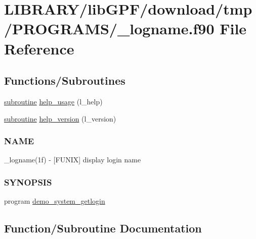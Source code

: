 \hypertarget{__logname_8f90}{}\section{L\+I\+B\+R\+A\+R\+Y/lib\+G\+P\+F/download/tmp/\+P\+R\+O\+G\+R\+A\+M\+S/\+\_\+logname.f90 File Reference}
\label{__logname_8f90}
\subsection*{Functions/\+Subroutines}
\begin{DoxyCompactItemize}
\item 
\hyperlink{M__stopwatch_83_8txt_acfbcff50169d691ff02d4a123ed70482}{subroutine} \hyperlink{__logname_8f90_a3e09a3b52ee8fb04eeb93fe5761626a8}{help\+\_\+usage} (l\+\_\+help)
\item 
\hyperlink{M__stopwatch_83_8txt_acfbcff50169d691ff02d4a123ed70482}{subroutine} \hyperlink{__logname_8f90_a39c21619b08a3c22f19e2306efd7f766}{help\+\_\+version} (l\+\_\+version)
\begin{DoxyCompactList}\small\item\em \subsubsection*{N\+A\+ME}

\+\_\+logname(1f) -\/ \mbox{[}F\+U\+N\+IX\mbox{]} display login name \subsubsection*{S\+Y\+N\+O\+P\+S\+IS}\end{DoxyCompactList}\item 
program \hyperlink{__logname_8f90_a8ae53eddb485d4c8597c4d4a204181a8}{demo\+\_\+system\+\_\+getlogin}
\end{DoxyCompactItemize}


\subsection{Function/\+Subroutine Documentation}
\mbox{\label{__logname_8f90_a8ae53eddb485d4c8597c4d4a204181a8}} 
